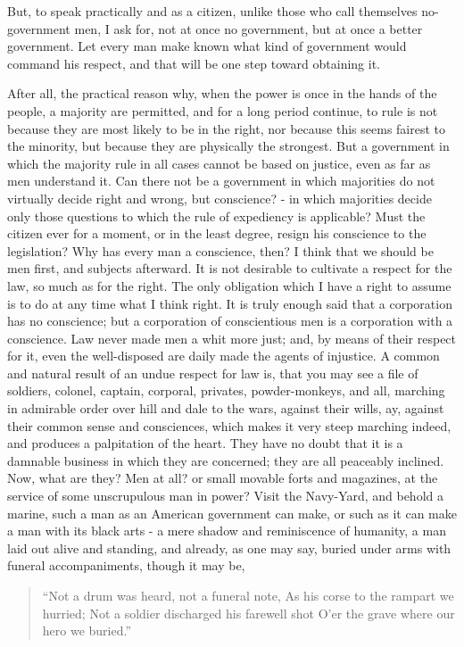 \documentclass[letterpaper,12pt,english]{sphinxmanual}
\begin{document}
But, to speak practically and as a citizen, unlike those who call themselves no-government men, I ask for, not at once no government, but at once a better government. Let every man make known what kind of government would command his respect, and that will be one step toward obtaining it.

After all, the practical reason why, when the power is once in the hands of the people, a majority are permitted, and for a long period continue, to rule is not because they are most likely to be in the right, nor because this seems fairest to the minority, but because they are physically the strongest. But a government in which the majority rule in all cases cannot be based on justice, even as far as men understand it. Can there not be a government in which majorities do not virtually decide right and wrong, but conscience? - in which majorities decide only those questions to which the rule of expediency is applicable? Must the citizen ever for a moment, or in the least degree, resign his conscience to the legislation? Why has every man a conscience, then? I think that we should be men first, and subjects afterward. It is not desirable to cultivate a respect for the law, so much as for the right. The only obligation which I have a right to assume is to do at any time what I think right. It is truly enough said that a corporation has no conscience; but a corporation of conscientious men is a corporation with a conscience. Law never made men a whit more just; and, by means of their respect for it, even the well-disposed are daily made the agents of injustice. A common and natural result of an undue respect for law is, that you may see a file of soldiers, colonel, captain, corporal, privates, powder-monkeys, and all, marching in admirable order over hill and dale to the wars, against their wills, ay, against their common sense and consciences, which makes it very steep marching indeed, and produces a palpitation of the heart. They have no doubt that it is a damnable business in which they are concerned; they are all peaceably inclined. Now, what are they? Men at all? or small movable forts and magazines, at the service of some unscrupulous man in power? Visit the Navy-Yard, and behold a marine, such a man as an American government can make, or such as it can make a man with its black arts - a mere shadow and reminiscence of humanity, a man laid out alive and standing, and already, as one may say, buried under arms with funeral accompaniments, though it may be,
\begin{quote}

``Not a drum was heard, not a funeral note,
As his corse to the rampart we hurried;
Not a soldier discharged his farewell shot
O'er the grave where our hero we buried.''
\end{quote}
\end{document}
